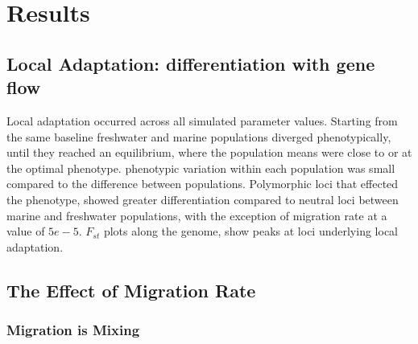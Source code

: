 \documentclass{article}
\begin{document}
\section{Results}





\subsection{Local Adaptation: differentiation with gene flow}

Local adaptation occurred across all simulated parameter values.
Starting from the same baseline freshwater and marine populations diverged phenotypically, 
until they reached an equilibrium,
where the population means were close to or at the optimal phenotype. 
phenotypic variation within each population was small compared to the difference between populations.
Polymorphic loci that effected the phenotype,
showed greater differentiation compared to neutral loci between marine and freshwater populations, with the exception 
of migration rate at a value of $5e-5$. 
$F_{st}$ plots along the genome, show peaks at loci underlying local adaptation.



\subsection{The Effect of Migration Rate}

\subsubsection*{Migration is Mixing}

\end{document}
